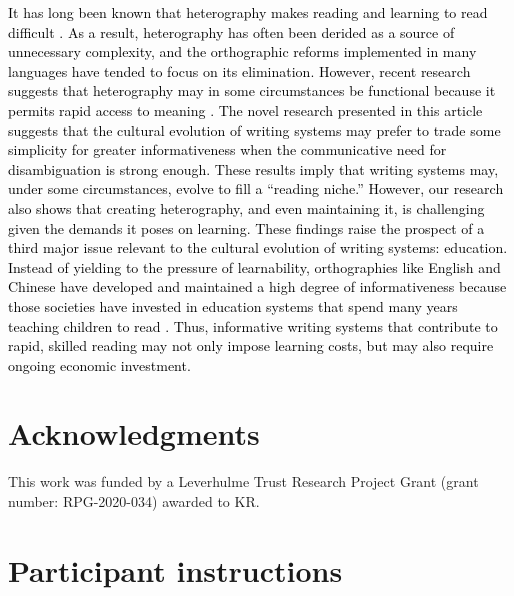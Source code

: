 \documentclass[doc,biblatex]{apa7}
\newcommand\newmaterial[1]{\textcolor{black}{#1}}
\begin{document}
\newmaterial{It has long been known that heterography makes reading and learning to read difficult \parencite{Pexman:2001, Seymour:2003}. As a result, heterography has often been derided as a source of unnecessary complexity, and the orthographic reforms implemented in many languages have tended to focus on its elimination. However, recent research suggests that heterography may in some circumstances be functional because it permits rapid access to meaning \parencite{Rastle:2019, Ulicheva:2020}. The novel research presented in this article suggests that the cultural evolution of writing systems may prefer to trade some simplicity for greater informativeness when the communicative need for disambiguation is strong enough. These results imply that writing systems may, under some circumstances, evolve to fill a “reading niche.” However, our research also shows that creating heterography, and even maintaining it, is challenging given the demands it poses on learning. These findings raise the prospect of a third major issue relevant to the cultural evolution of writing systems: education. Instead of yielding to the pressure of learnability, orthographies like English and Chinese have developed and maintained a high degree of informativeness because those societies have invested in education systems that spend many years teaching children to read \parencite[e.g.,][]{Xinchun:1999}. Thus, informative writing systems that contribute to rapid, skilled reading may not only impose learning costs, but may also require ongoing economic investment.}


\section{Acknowledgments}

\noindent This work was funded by a Leverhulme Trust Research Project Grant (grant number: RPG-2020-034) awarded to KR.

\printbibliography


\clearpage

\appendix


\section{Participant instructions}
\end{document}
